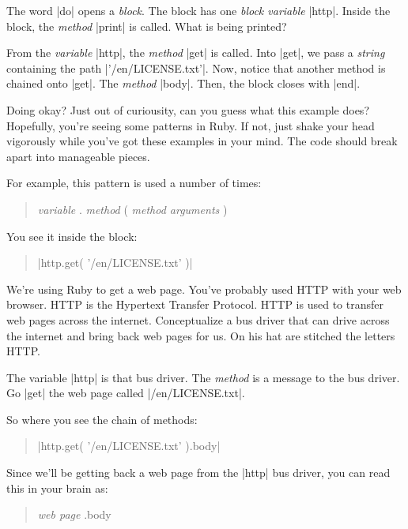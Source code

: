 \documentclass[12pt,twoside]{report}
\begin{document}
The word \rubyinline|do| opens a {\em block}.  The
block has one {\em block variable} \rubyinline|http|.
Inside the block, the {\em method} \rubyinline|print|
is called.  What is being printed?

From the {\em variable} \rubyinline|http|, the {\em
  method} \rubyinline|get| is called.  Into
\rubyinline|get|, we pass a {\em string} containing
the path \rubyinline|'/en/LICENSE.txt'|.  Now, notice
that another method is chained onto \rubyinline|get|.
The {\em method} \rubyinline|body|.  Then, the block
closes with \rubyinline|end|.

Doing okay?  Just out of curiousity, can you guess what this example
does?  Hopefully, you're seeing some patterns in Ruby.  If not, just
shake your head vigorously while you've got these examples in your
mind.  The code should break apart into manageable pieces.

For example, this pattern is used a number of times:

\begin{quote}
{\em variable} . {\em method} ( {\em method arguments} )\end{quote}


You see it inside the block:

\begin{quote}
\rubyinline|http.get( '/en/LICENSE.txt' )|\end{quote}


We're using Ruby to get a web page.  You've probably used HTTP with
your web browser.  HTTP is the Hypertext Transfer Protocol.  HTTP is
used to transfer web pages across the internet.  Conceptualize a bus
driver that can drive across the internet and bring back web pages for
us.  On his hat are stitched the letters HTTP.

The variable \rubyinline|http| is that bus driver.
The {\em method} is a message to the bus driver.  Go
\rubyinline|get| the web page called
\consoleinline|/en/LICENSE.txt|.

So where you see the chain of methods:

\begin{quote}
\rubyinline|http.get( '/en/LICENSE.txt' ).body|\end{quote}


Since we'll be getting back a web page from the
\rubyinline|http| bus driver, you can read this in
your brain as:

\begin{quote}
{\em web page} .body\end{quote}
\end{document}
